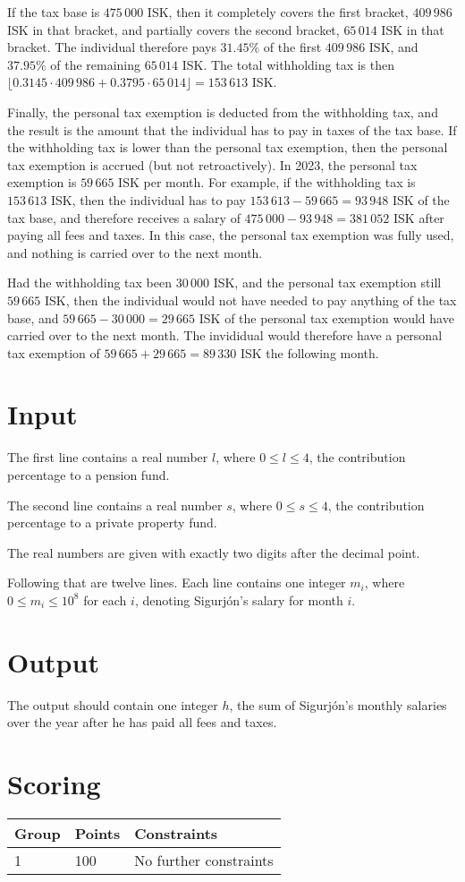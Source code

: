 If the tax base is $475\,000$ ISK, then it completely covers the first bracket,
$409\,986$ ISK in that bracket, and partially covers the second bracket,
$65\,014$ ISK in that bracket. The individual therefore pays $31.45\%$ of the
first $409\,986$ ISK, and $37.95\%$ of the remaining $65\,014$ ISK. The total
withholding tax is then
$\lfloor 0.3145 \cdot 409\,986 + 0.3795 \cdot 65\,014 \rfloor = 153\,613$ ISK.

Finally, the personal tax exemption is deducted from the withholding tax, and
the result is the amount that the individual has to pay in taxes of the tax
base. If the withholding tax is lower than the personal tax exemption, then the
personal tax exemption is accrued (but not retroactively). In 2023, the personal
tax exemption is $59\,665$ ISK per month. For example, if the withholding tax is
$153\,613$ ISK, then the individual has to pay
$153\,613 - 59\,665 = 93\,948$ ISK of the tax base, and therefore receives
a salary of $475\,000 - 93\,948 = 381\,052$ ISK after paying all fees and
taxes. In this case, the personal tax exemption was fully used, and nothing is
carried over to the next month.

Had the withholding tax been $30\,000$ ISK, and the personal tax exemption still
$59\,665$ ISK, then the individual would not have needed to pay anything of the
tax base, and $59\,665 - 30\,000 = 29\,665$ ISK of the personal tax exemption
would have carried over to the next month. The invididual would therefore have a
personal tax exemption of $59\,665 + 29\,665 = 89\,330$ ISK the following month.

\section*{Input}
The first line contains a real number $l$, where $0 \leq l \leq 4$, the
contribution percentage to a pension fund.

The second line contains a real number $s$, where $0 \leq s \leq 4$, the
contribution percentage to a private property fund.

The real numbers are given with exactly two digits after the decimal
point.

Following that are twelve lines. Each line contains one integer $m_{i}$,
where $0 \leq m_i \leq 10^8$ for each $i$, denoting Sigurjón's salary for month $i$.

\section*{Output}
The output should contain one integer $h$, the sum of Sigurjón's monthly
salaries over the year after he has paid all fees and taxes.

\section*{Scoring}
\begin{tabular}{|l|l|l|}
\hline
Group & Points & Constraints \\ \hline
1     & 100  & No further constraints\\ \hline
\end{tabular}
